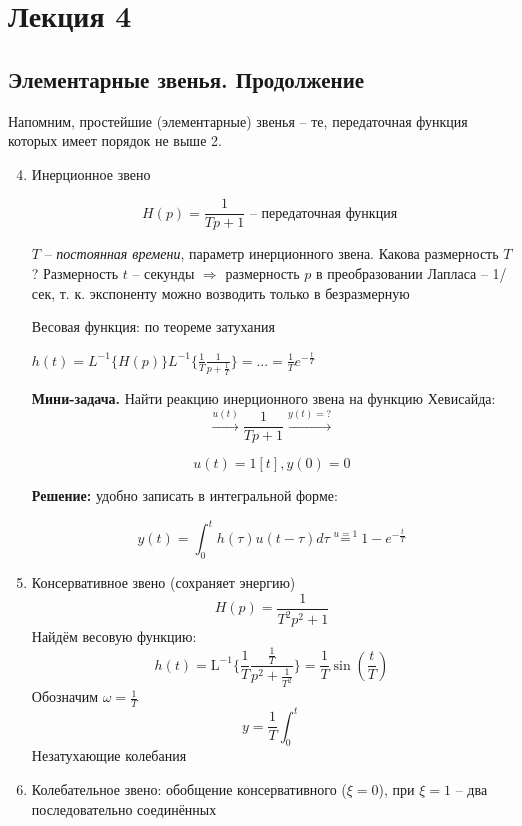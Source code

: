 \documentclass[main.tex]{subfiles}
\begin{document}
\section{ Лекция 4 }

\subsection{Элементарные звенья. Продолжение}

Напомним, простейшие (элементарные) звенья -- те, передаточная функция которых имеет порядок не выше 2.

\begin{enumerate}[noitemsep]
    \setcounter{enumi}{3} %
    \item Инерционное звено

    $$ H(p) = \frac{1}{Tp + 1} \text{ -- передаточная функция } $$

    $ T $ -- \emph{постоянная времени}, параметр инерционного звена.
    Какова размерность $T$?
    Размерность $t$ -- секунды $\Rightarrow$ размерность $p$ в преобразовании Лапласа -- 1/сек, т. к. экспоненту можно возводить только в безразмерную

    Весовая функция: по теореме затухания

    $ h(t) = L^{-1}\{H(p)\} L^{-1}\{\frac{1}{T} \frac{1}{p + \frac{1}{T}}\} = ... = \frac{1}{T}e^{-\frac{t}{T}} $

    \textbf{Мини-задача.} Найти реакцию инерционного звена на функцию Хевисайда:
    $$ \xrightarrow{u(t)} \boxed{\frac{1}{Tp+1}} \xrightarrow{y(t)=?} $$

    $$ u(t) = 1[t], y(0) = 0 $$

    \textbf{Решение:} удобно записать в интегральной форме:

    $$ y(t) = \int_0^t h(\tau) u(t-\tau) d\tau \overset{u = 1}= 1 - e^{-\frac{t}{T}} $$

    \item Консервативное звено (сохраняет энергию)
    $$ H(p) = \frac{1}{T^2p^2 + 1} $$
    Найдём весовую функцию:
    $$ h(t) = \mathrm{L}^{-1}\{\frac{1}{T} \frac{\frac{1}{T}}{p^2 + \frac{1}{T^2}}\} = \frac{1}{T} \sin(\frac{t}{T}) $$
    Обозначим $ \omega = \frac{1}{T} $
    $$ y = \frac{1}{T} \int_0^t $$ %
    Незатухающие колебания

    \item Колебательное звено: обобщение консервативного ($\xi = 0$), при $\xi=1$ -- два последовательно соединённых %


\end{enumerate}
\end{document}

